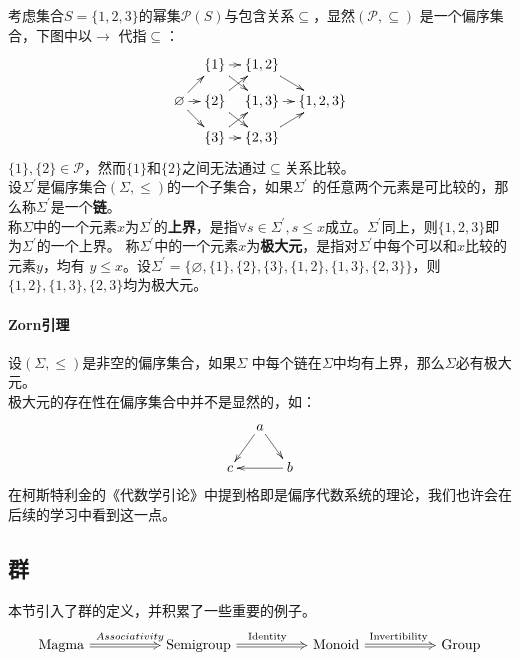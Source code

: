 \documentclass{article}
\begin{document}
考虑集合$S = \{ 1, 2, 3\}$的幂集$\mathcal{P}(S)$与包含关系$\subseteq$，显然$(\mathcal{P}, \subseteq)$
是一个偏序集合，下图中以$\rightarrow$
代指$\subseteq$：
\begin{equation*}
    \xymatrix@R=10pt@C=8pt{
                                        & \{1\}\ar[r]\ar[dr]  & \{1,2\}\ar[dr]  &         \\
        \varnothing\ar[ur]\ar[r]\ar[dr] & \{2\}\ar[ur]\ar[dr] & \{1,3\} \ar[r]  &\{1,2,3\}\\
                                        & \{3\}\ar[r]\ar[ur]  & \{2,3\}\ar[ur]  &
    }
\end{equation*}
$\{1\},\{2\} \in \mathcal{P}$，然而$\{1\}$和$\{2\}$之间无法通过$\subseteq$关系比较。\\
设$\Sigma^{\prime}$是偏序集合$(\Sigma, \leq)$的一个子集合，如果$\Sigma^{\prime}$
的任意两个元素是可比较的，那么称$\Sigma^{\prime}$是一个\textbf{链}。\\
称$\Sigma$中的一个元素$x$为$\Sigma^{\prime}$的\textbf{上界}，是指$\forall s \in \Sigma^{\prime},
s \leq x$成立。$\Sigma^{\prime}$同上，则$\{1,2,3\}$即为$\Sigma^{\prime}$的一个上界。
称$\Sigma^{\prime}$中的一个元素$x$为\textbf{极大元}，是指对$\Sigma^{\prime}$中每个可以和$x$比较的元素$y$，均有
$y \leq x$。设$\Sigma^{\prime}=\{ \varnothing, \{1\}, \{2\}, \{3\}, \{1,2\},
\{1,3\}, \{2,3\}\}$，则$\{1,2\}, \{1,3\}, \{2,3\}$均为极大元。

\paragraph{Zorn引理}设$(\Sigma, \leq)$是非空的偏序集合，如果$\Sigma$
中每个链在$\Sigma$中均有上界，那么$\Sigma$必有极大元。
\\

极大元的存在性在偏序集合中并不是显然的，如：
\begin{equation*}
    \xymatrix@C=17pt@R=10pt@d{
                        & b\ar[dd]\\
        a\ar[ur] \ar[dr]&         \\
                        & c
    }
\end{equation*}
在柯斯特利金的《代数学引论》中提到格即是偏序代数系统的理论，我们也许会在后续的学习中看到这一点。

\subsection{群}

本节引入了群的定义，并积累了一些重要的例子。
\begin{equation*}
    \xymatrix@1{
        \text{ Magma } \ar@{=>}^{Associativity}[rr] &&
        \text{ Semigroup } \ar@{=>}^{\text{Identity}}[rr] &&
        \text{ Monoid } \ar@{=>}^{\text{Invertibility}}[rr] && 
        \text{ Group }
    }
\end{equation*}
\end{document}
